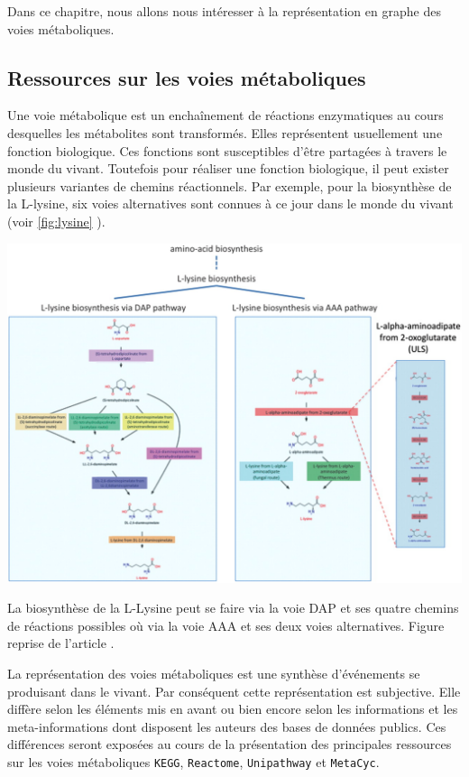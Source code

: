 \begin{refsegment}
\begin{itemize}
    \end{itemize}
    Dans ce chapitre, nous allons nous intéresser à la représentation en graphe des voies métaboliques. 
    
    \subsection{Ressources sur les voies métaboliques}
    
    Une voie métabolique est un enchaînement de réactions enzymatiques au cours desquelles les métabolites sont transformés. Elles représentent usuellement une fonction biologique. Ces fonctions sont susceptibles d'être partagées à travers le monde du vivant. Toutefois pour réaliser une fonction biologique, il peut exister plusieurs variantes de chemins réactionnels. Par exemple, pour la biosynthèse de la L-lysine, six voies alternatives sont connues à ce jour dans le monde du vivant (voir \cref{fig:lysine} ).
    	
    	
   	\begin{shadedfigure}[H]
   		\centering
   		\includegraphics[width=\textwidth]{img/L-lysine-biosynthesis.jpg}
   		\caption{La biosynthèse de la L-Lysine peut se faire via la voie DAP et ses quatre chemins de réactions possibles où via la voie AAA et ses deux voies alternatives. Figure reprise de l'article . }
   		\label{fig:lysine}
   	\end{shadedfigure}
     
     La représentation des voies métaboliques est une synthèse d'événements se produisant dans le vivant. Par conséquent cette représentation est subjective. Elle diffère selon les éléments mis en avant ou bien encore selon les informations et les meta-informations dont disposent les auteurs des bases de données publics. Ces différences seront exposées au cours de la présentation des principales ressources sur les voies métaboliques \texttt{\gls{KEGG}}, \texttt{Reactome}, \texttt{Unipathway} et \texttt{MetaCyc}.
     

\end{refsegment}
